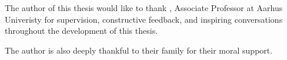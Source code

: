 The author of this thesis would like to thank \SupervisorName, Associate Professor at Aarhus Univeristy for supervision, constructive feedback, and inspiring conversations throughout the development of this thesis. 
\vspace{1em}

\noindent The author is also deeply thankful to their family for their moral support. 
